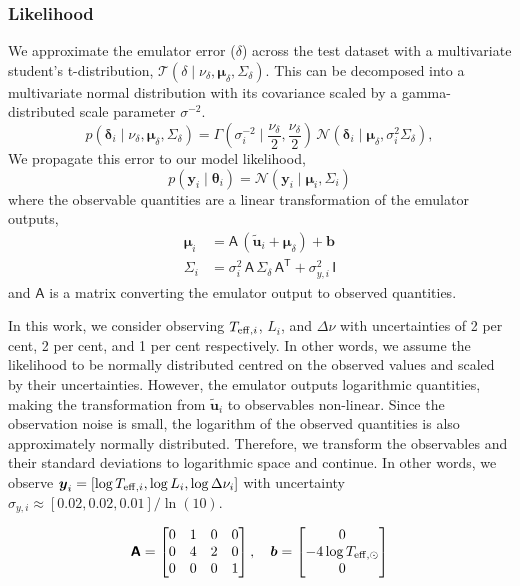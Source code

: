 \documentclass[fleqn,usenatbib]{mnras}
\newcommand{\normaldist}{\mathcal{N}}
\newcommand{\gammadist}{\Gamma}
\newcommand{\tdist}{\mathcal{T}}
\renewcommand*{\vec}[1]{\boldsymbol{#1}}
\newcommand*{\mat}[1]{\boldsymbol{\mathsf{#1}}}
\newcommand*{\transpose}{\mathsf{T}}
\newcommand{\obs}{{\vec{y}}}
\newcommand{\outputs}{{\vec{u}}}
\newcommand{\pred}{{\tilde{\outputs}}}
\newcommand{\error}{{\vec{\delta}}}
\newcommand{\teff}[1][]{{\ensuremath{T_{\mathrm{eff} \ifx#1\empty \else , #1 \fi}}}}
\begin{document}
\subsubsection{Likelihood}

We approximate the emulator error (\(\delta\)) across the test dataset with a multivariate student's t-distribution, \(\tdist(\delta \mid \nu_\delta, \vec\mu_\delta, \mat\Sigma_\delta)\). This can be decomposed into a multivariate normal distribution with its covariance scaled by a gamma-distributed scale parameter \(\sigma^{-2}\).
%
\begin{equation}
    p(\error_i \mid \nu_\delta, \vec\mu_\delta, \mat\Sigma_\delta) = \gammadist(\sigma_i^{-2} \mid \frac{\nu_\delta}{2}, \frac{\nu_\delta}{2}) \, \normaldist(\error_i \mid \vec\mu_\delta, \sigma_i^2 \mat\Sigma_\delta),
\end{equation}
%
We propagate this error to our model likelihood,
%
\begin{equation}
    p(\obs_i \mid \vec\theta_i) = \normaldist(\obs_i \mid \vec\mu_i, \mat\Sigma_i)
\end{equation}
%
where the observable quantities are a linear transformation of the emulator outputs,
%
\begin{align}
    \vec\mu_i &= \mat A \, (\pred_i + \vec\mu_\delta) + \vec b\\
    \mat\Sigma_i &= \sigma_i^2 \, \mat{A} \, \mat{\Sigma}_\delta \, \mat{A}^{\transpose} + \sigma_{y,i}^2 \, \mat{I} \label{eq:covariance}
\end{align}
%
and \(\mat A\) is a matrix converting the emulator output to observed quantities.

In this work, we consider observing \(\teff[i]\), \(L_i\), and \(\Delta\nu\) with uncertainties of 2 per cent, 2 per cent, and 1 per cent respectively. In other words, we assume the likelihood to be normally distributed centred on the observed values and scaled by their uncertainties. However, the emulator outputs logarithmic quantities, making the transformation from \(\pred_i\) to observables non-linear. Since the observation noise is small, the logarithm of the observed quantities is also approximately normally distributed. Therefore, we transform the observables and their standard deviations to logarithmic space and continue. In other words, we observe \(\obs_i = [\log\teff[i], \log L_i, \log\Delta\nu_i]\) with uncertainty \(\sigma_{y, i} \approx [0.02, 0.02, 0.01] / \ln(10)\).

\begin{equation}
    \mat A = 
    \begin{bmatrix}
        0 & 1 & 0 & 0\\
        0 & 4 & 2 & 0\\
        0 & 0 & 0 & 1
    \end{bmatrix}
    , \quad
    \vec b =
    \begin{bmatrix}
        0\\
        - 4 \log \teff[\odot]\\
        0
    \end{bmatrix}
\end{equation}
\end{document}

